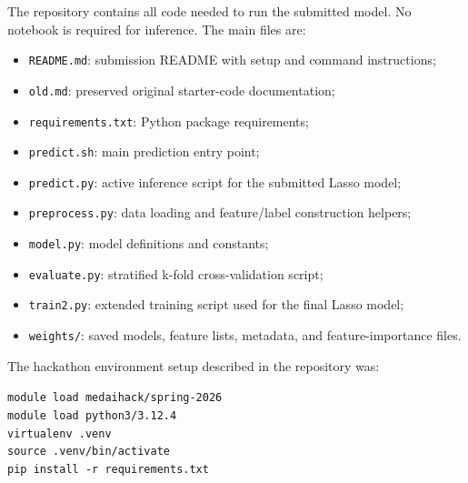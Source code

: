 \documentclass[11pt]{article}
\begin{document}
The repository contains all code needed to run the submitted model. No notebook is required for inference. The main files are:

\begin{itemize}
    \item \texttt{README.md}: submission README with setup and command instructions;
    \item \texttt{old.md}: preserved original starter-code documentation;
    \item \texttt{requirements.txt}: Python package requirements;
    \item \texttt{predict.sh}: main prediction entry point;
    \item \texttt{predict.py}: active inference script for the submitted Lasso model;
    \item \texttt{preprocess.py}: data loading and feature/label construction helpers;
    \item \texttt{model.py}: model definitions and constants;
    \item \texttt{evaluate.py}: stratified k-fold cross-validation script;
    \item \texttt{train2.py}: extended training script used for the final Lasso model;
    \item \texttt{weights/}: saved models, feature lists, metadata, and feature-importance files.
\end{itemize}

The hackathon environment setup described in the repository was:

\begin{center}
\texttt{module load medaihack/spring-2026}\\
\texttt{module load python3/3.12.4}\\
\texttt{virtualenv .venv}\\
\texttt{source .venv/bin/activate}\\
\texttt{pip install -r requirements.txt}
\end{center}
\end{document}
